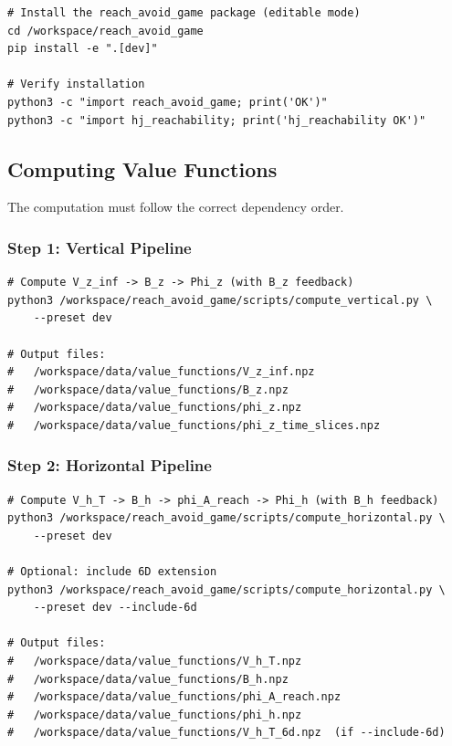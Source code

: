 \documentclass[11pt,a4paper]{article}
\begin{document}
\begin{lstlisting}[style=bashstyle]
# Install the reach_avoid_game package (editable mode)
cd /workspace/reach_avoid_game
pip install -e ".[dev]"

# Verify installation
python3 -c "import reach_avoid_game; print('OK')"
python3 -c "import hj_reachability; print('hj_reachability OK')"
\end{lstlisting}

\subsection{Computing Value Functions}

The computation must follow the correct dependency order.

\subsubsection{Step 1: Vertical Pipeline}

\begin{lstlisting}[style=bashstyle]
# Compute V_z_inf -> B_z -> Phi_z (with B_z feedback)
python3 /workspace/reach_avoid_game/scripts/compute_vertical.py \
    --preset dev

# Output files:
#   /workspace/data/value_functions/V_z_inf.npz
#   /workspace/data/value_functions/B_z.npz
#   /workspace/data/value_functions/phi_z.npz
#   /workspace/data/value_functions/phi_z_time_slices.npz
\end{lstlisting}

\subsubsection{Step 2: Horizontal Pipeline}

\begin{lstlisting}[style=bashstyle]
# Compute V_h_T -> B_h -> phi_A_reach -> Phi_h (with B_h feedback)
python3 /workspace/reach_avoid_game/scripts/compute_horizontal.py \
    --preset dev

# Optional: include 6D extension
python3 /workspace/reach_avoid_game/scripts/compute_horizontal.py \
    --preset dev --include-6d

# Output files:
#   /workspace/data/value_functions/V_h_T.npz
#   /workspace/data/value_functions/B_h.npz
#   /workspace/data/value_functions/phi_A_reach.npz
#   /workspace/data/value_functions/phi_h.npz
#   /workspace/data/value_functions/V_h_T_6d.npz  (if --include-6d)
\end{lstlisting}
\end{document}
